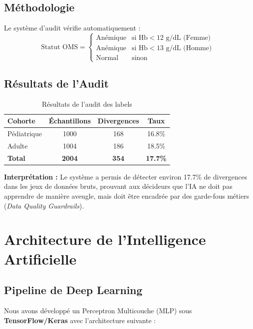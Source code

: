 \documentclass[12pt,a4paper]{article}
\begin{document}
\subsection{Méthodologie}
Le système d'audit vérifie automatiquement :
\begin{equation}
\text{Statut OMS} = 
\begin{cases}
\text{Anémique} & \text{si Hb} < 12 \text{ g/dL (Femme)} \\
\text{Anémique} & \text{si Hb} < 13 \text{ g/dL (Homme)} \\
\text{Normal} & \text{sinon}
\end{cases}
\end{equation}

\subsection{Résultats de l'Audit}
\begin{table}[H]
\centering
\caption{Résultats de l'audit des labels}
\label{tab:audit}
\begin{tabular}{l c c c}
\toprule
\textbf{Cohorte} & \textbf{Échantillons} & \textbf{Divergences} & \textbf{Taux} \\
\midrule
Pédiatrique & 1000 & 168 & 16.8\% \\
Adulte & 1004 & 186 & 18.5\% \\
\textbf{Total} & \textbf{2004} & \textbf{354} & \textbf{17.7\%} \\
\bottomrule
\end{tabular}
\end{table}

\textbf{Interprétation :} Le système a permis de détecter environ 17.7\% de divergences dans les jeux de données bruts, prouvant aux décideurs que l'IA ne doit pas apprendre de manière aveugle, mais doit être encadrée par des garde-fous métiers (\textit{Data Quality Guardrails}).

\section{Architecture de l'Intelligence Artificielle}
\label{sec:ia}

\subsection{Pipeline de Deep Learning}
Nous avons développé un Perceptron Multicouche (MLP) sous \textbf{TensorFlow/Keras} avec l'architecture suivante :
\end{document}
